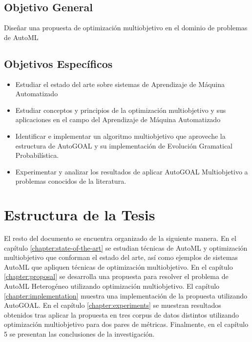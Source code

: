 \subsection*{Objetivo General}
Dise\~nar una propuesta de optimizaci\'on multiobjetivo en el dominio de problemas de AutoML
\subsection*{Objetivos Espec\'ificos}
\begin{itemize}
    \item Estudiar el estado del arte sobre sistemas de Aprendizaje de M\'aquina Automatizado
    \item Estudiar conceptos y principios de la optimizaci\'on multiobjetivo y sus aplicaciones en el campo del Aprendizaje de M\'aquina Automatizado
    \item Identificar e implementar un algoritmo multiobjetivo que aproveche la estructura de AutoGOAL y su implementaci\'on de Evoluci\'on Gramatical Probabil\'istica.
    \item Experimentar y analizar los resultados de aplicar AutoGOAL Multiobjetivo a problemas conocidos de la literatura.
\end{itemize}

\section*{Estructura de la Tesis}
El resto del documento se encuentra organizado de la siguiente manera. En el cap\'itulo \ref{chapter:state-of-the-art} se estudian t\'ecnicas de AutoML y optimizaci\'on multiobjetivo que conforman el estado del arte, as\'i como ejemplos de sistemas AutoML que apliquen t\'ecnicas de optimizaci\'on multiobjetivo. En el cap\'itulo \ref{chapter:proposal} se desarrolla una propuesta para resolver el problema de AutoML Heterog\'eneo utilizando optimizaci\'on multiobjetivo. El cap\'itulo \ref{chapter:implementation} muestra una implementaci\'on de la propuesta utilizando AutoGOAL. En el cap\'itulo \ref{chapter:experiments} se muestran resultados obtenidos tras aplicar la propuesta en tres corpus de datos distintos utilizando optimizaci\'on multiobjetivo para dos pares de m\'etricas. 
Finalmente, en el cap\'itulo 5 se presentan las conclusiones de la investigaci\'on.
